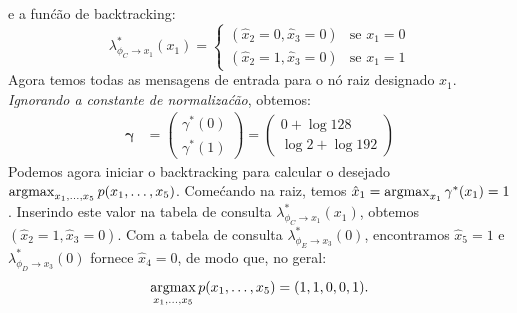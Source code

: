 \begin{exenumerate}
\begin{solution}
\begin{equation}
        \end{equation}
        e a fun\'c\~ao de backtracking:
        \begin{equation}
            \lambda^*_{\phi_C \to x_1}(x_1) = \begin{cases}
                (\hat{x}_2=0, \hat{x}_3=0) & \text{se } x_1=0\\
                (\hat{x}_2=1, \hat{x}_3=0) & \text{se } x_1=1
            \end{cases}
        \end{equation}
        Agora temos todas as mensagens de entrada para o n\'o raiz designado $x_1$. \emph{Ignorando a constante de normaliza\'c\~ao}, obtemos:
        \begin{align}
            \boldsymbol{\gamma}&=\begin{pmatrix}
                \gamma^*(0) \\
                \gamma^*(1)
            \end{pmatrix}
            = \begin{pmatrix}
                0 + \log 128 \\
                \log 2 + \log 192 
            \end{pmatrix}
        \end{align}
        Podemos agora iniciar o backtracking para calcular o desejado
        $\operatorname*{\mathrm{argmax}}_{x_1, \ldots, x_5} p(x_1, \ldots, x_5)$. Come\'cando na
        raiz, temos $\hat{x}_1 = \operatorname*{\mathrm{argmax}}_{x_1} \gamma^*(x_1) = 1$. Inserindo este valor na tabela de consulta $\lambda^*_{\phi_C \to x_1}(x_1)$, obtemos $(\hat{x}_2=1, \hat{x}_3=0)$. Com a tabela de consulta $\lambda^*_{\phi_E \to x_3}(0)$, encontramos $\hat{x}_5=1$ e $\lambda^*_{\phi_D \to x_3}(0)$ fornece $\hat{x}_4=0$, de modo que, no geral:
        \begin{equation}
            \operatorname*{\mathrm{argmax}}_{x_1, \ldots, x_5} p(x_1, \ldots, x_5) = (1, 1, 0, 0, 1).
        \end{equation}
        
        
    \end{solution}
    

\end{exenumerate}
